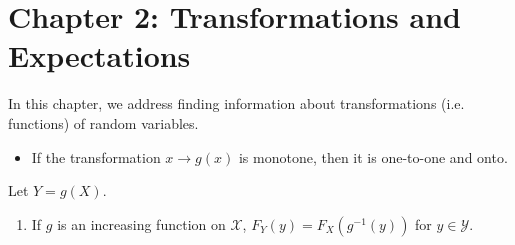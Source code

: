\documentclass[../main]{subfiles}
\begin{document}
\chapter{Chapter 2: Transformations and Expectations}

In this chapter, we address finding information about transformations (i.e. functions) of random variables.

\begin{itemize}
    \item If the transformation $x\to g(x)$ is monotone, then it is one-to-one and onto.
\end{itemize}
\begin{theorem}
    Let $Y=g(X)$.
    \begin{enumerate}
        \item If $g$ is an increasing function on $\mathcal X$, $F_Y(y) = F_X(g^{-1}(y))$ for $y\in\mathcal Y$.
    \end{enumerate}
\end{theorem}
\end{document}
